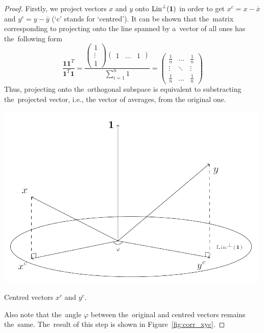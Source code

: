 \begin{proof}
Firstly, we project vectors $x$ and $y$ onto $\operatorname{Lin}^{\perp}(\mathbf{1})$
in order to get $x^c = x - \bar x$ and $y^c = y - \bar y$ (`c' stands for `centred').
It can be shown that the~matrix corresponding to projecting onto the line spanned by
a~vector of all ones has the~following form
\[
\frac{\mathbf{1} \mathbf{1}^T}{\mathbf{1}^T \mathbf{1}} =
\frac{
\begin{pmatrix}
  1 \\
  \vdots \\
  1
\end{pmatrix}
\begin{pmatrix}
  1 & \ldots & 1
\end{pmatrix}
}{\sum_{i=1}^n 1} =
\begin{pmatrix}
  \frac{1}{n} & \ldots & \frac{1}{n} \\
  \vdots & \ddots & \vdots \\
  \frac{1}{n} & \ldots & \frac{1}{n}
\end{pmatrix}
\]
Thus, projecting onto the~orthogonal subspace is equivalent to
substracting the~projected vector, i.e., the vector of averages, from the original one.

\begin{marginfigure}
\includegraphics[scale=0.65]{figures/02_correlation_constant_centered_variables.pdf}
\caption{Centred vectors $x^c$ and $y^c$.}
\label{fig:corr_xyc}
\end{marginfigure}

Also note that the~angle $\varphi$ between the~original and centred vectors remains the~same.
The~result of this step is shown in Figure~\ref{fig:corr_xyc}.


\end{proof}
